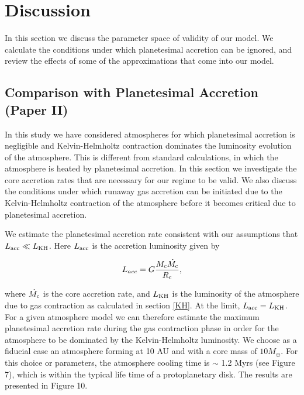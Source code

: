 \documentclass[apj]{emulateapj}
\begin{document}
\section{Discussion}
\label{discussion}

In this section we discuss the parameter space of validity of our model. We calculate the conditions under which planetesimal accretion can be ignored, and review the effects of some of the approximations that come into our model.

\subsection{Comparison with Planetesimal Accretion \textbf{(Paper II)}}
\label{acc}

In this study we have considered atmospheres for which planetesimal accretion is negligible and Kelvin-Helmholtz contraction dominates the luminosity evolution of the atmosphere. This is different from standard calculations, in which the atmosphere is heated by planetesimal accretion. In this section we investigate the core accretion rates that are necessary for our regime to be valid. We also discuss the conditions under which runaway gas accretion can be initiated due to the Kelvin-Helmholtz contraction of the atmosphere before it becomes critical due to planetesimal accretion.

We estimate the planetesimal accretion rate consistent with our assumptions that $L_{\mathrm{acc}} \ll L_{\rm{KH}}$. Here $L_{\rm{acc}}$ is the accretion luminosity given by

\begin{equation}
\label{eq:Lacc}
L_{acc}=G \frac{M_{\rm{c}} \dot{M_{\rm{c}}}}{R_{\rm{c}}},
\end{equation}

\noindent where $\dot{M_{\rm{c}}}$ is the core accretion rate, and $L_{\rm{KH}}$ is the luminosity of the atmosphere due to gas contraction as calculated in section \ref{KH}. At the limit, $L_{\rm{acc}}=L_{\rm{KH}}$. For a given atmosphere model we can therefore estimate the maximum planetesimal accretion rate during the gas contraction phase in order for the atmosphere to be dominated by the Kelvin-Helmholtz luminosity. We choose as a fiducial case an atmosphere forming at 10 AU and with a core mass of $10 M_{\oplus}$. For this choice or parameters, the atmosphere cooling time is $\sim$ 1.2 Myrs (see Figure 7), which is within the typical life time of a protoplanetary disk. The results are presented in Figure 10. 
\end{document}
